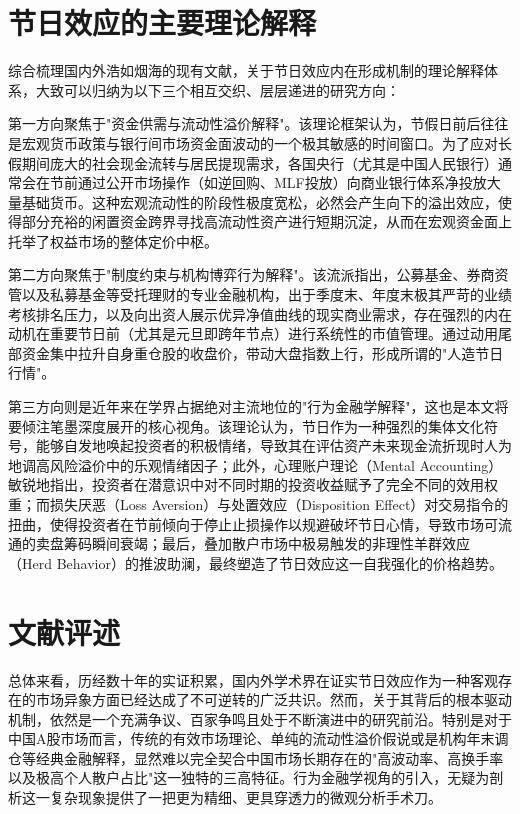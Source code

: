\documentclass{cupb-thesis}
\begin{document}
\section{节日效应的主要理论解释}


综合梳理国内外浩如烟海的现有文献，关于节日效应内在形成机制的理论解释体系，大致可以归纳为以下三个相互交织、层层递进的研究方向：


第一方向聚焦于"资金供需与流动性溢价解释"。该理论框架认为，节假日前后往往是宏观货币政策与银行间市场资金面波动的一个极其敏感的时间窗口。为了应对长假期间庞大的社会现金流转与居民提现需求，各国央行（尤其是中国人民银行）通常会在节前通过公开市场操作（如逆回购、MLF投放）向商业银行体系净投放大量基础货币。这种宏观流动性的阶段性极度宽松，必然会产生向下的溢出效应，使得部分充裕的闲置资金跨界寻找高流动性资产进行短期沉淀，从而在宏观资金面上托举了权益市场的整体定价中枢。


第二方向聚焦于"制度约束与机构博弈行为解释"。该流派指出，公募基金、券商资管以及私募基金等受托理财的专业金融机构，出于季度末、年度末极其严苛的业绩考核排名压力，以及向出资人展示优异净值曲线的现实商业需求，存在强烈的内在动机在重要节日前（尤其是元旦即跨年节点）进行系统性的市值管理。通过动用尾部资金集中拉升自身重仓股的收盘价，带动大盘指数上行，形成所谓的"人造节日行情"。


第三方向则是近年来在学界占据绝对主流地位的"行为金融学解释"，这也是本文将要倾注笔墨深度展开的核心视角。该理论认为，节日作为一种强烈的集体文化符号，能够自发地唤起投资者的积极情绪，导致其在评估资产未来现金流折现时人为地调高风险溢价中的乐观情绪因子；此外，心理账户理论（Mental Accounting）敏锐地指出，投资者在潜意识中对不同时期的投资收益赋予了完全不同的效用权重；而损失厌恶（Loss Aversion）与处置效应（Disposition Effect）对交易指令的扭曲，使得投资者在节前倾向于停止止损操作以规避破坏节日心情，导致市场可流通的卖盘筹码瞬间衰竭；最后，叠加散户市场中极易触发的非理性羊群效应（Herd Behavior）的推波助澜，最终塑造了节日效应这一自我强化的价格趋势。


\section{文献评述}


总体来看，历经数十年的实证积累，国内外学术界在证实节日效应作为一种客观存在的市场异象方面已经达成了不可逆转的广泛共识。然而，关于其背后的根本驱动机制，依然是一个充满争议、百家争鸣且处于不断演进中的研究前沿。特别是对于中国A股市场而言，传统的有效市场理论、单纯的流动性溢价假说或是机构年末调仓等经典金融解释，显然难以完全契合中国市场长期存在的"高波动率、高换手率以及极高个人散户占比"这一独特的三高特征。行为金融学视角的引入，无疑为剖析这一复杂现象提供了一把更为精细、更具穿透力的微观分析手术刀。
\end{document}
